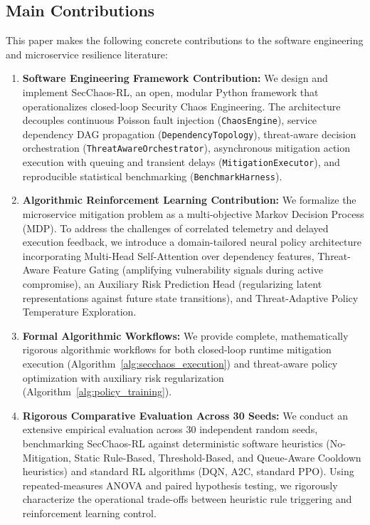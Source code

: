 \documentclass[ASNA,twocolumn]{USG}
\begin{document}
\subsection{Main Contributions}
This paper makes the following concrete contributions to the software engineering and microservice resilience literature:
\begin{enumerate}
    \item \textbf{Software Engineering Framework Contribution:} We design and implement SecChaos-RL, an open, modular Python framework that operationalizes closed-loop Security Chaos Engineering. The architecture decouples continuous Poisson fault injection (\texttt{ChaosEngine}), service dependency DAG propagation (\texttt{DependencyTopology}), threat-aware decision orchestration (\texttt{ThreatAwareOrchestrator}), asynchronous mitigation action execution with queuing and transient delays (\texttt{MitigationExecutor}), and reproducible statistical benchmarking (\texttt{BenchmarkHarness}).
    \item \textbf{Algorithmic Reinforcement Learning Contribution:} We formalize the microservice mitigation problem as a multi-objective Markov Decision Process (MDP). To address the challenges of correlated telemetry and delayed execution feedback, we introduce a domain-tailored neural policy architecture incorporating Multi-Head Self-Attention over dependency features, Threat-Aware Feature Gating (amplifying vulnerability signals during active compromise), an Auxiliary Risk Prediction Head (regularizing latent representations against future state transitions), and Threat-Adaptive Policy Temperature Exploration.
    \item \textbf{Formal Algorithmic Workflows:} We provide complete, mathematically rigorous algorithmic workflows for both closed-loop runtime mitigation execution (Algorithm~\ref{alg:secchaos_execution}) and threat-aware policy optimization with auxiliary risk regularization (Algorithm~\ref{alg:policy_training}).
    \item \textbf{Rigorous Comparative Evaluation Across 30 Seeds:} We conduct an extensive empirical evaluation across 30 independent random seeds, benchmarking SecChaos-RL against deterministic software heuristics (No-Mitigation, Static Rule-Based, Threshold-Based, and Queue-Aware Cooldown heuristics) and standard RL algorithms (DQN, A2C, standard PPO). Using repeated-measures ANOVA and paired hypothesis testing, we rigorously characterize the operational trade-offs between heuristic rule triggering and reinforcement learning control.

\end{enumerate}
\end{document}

